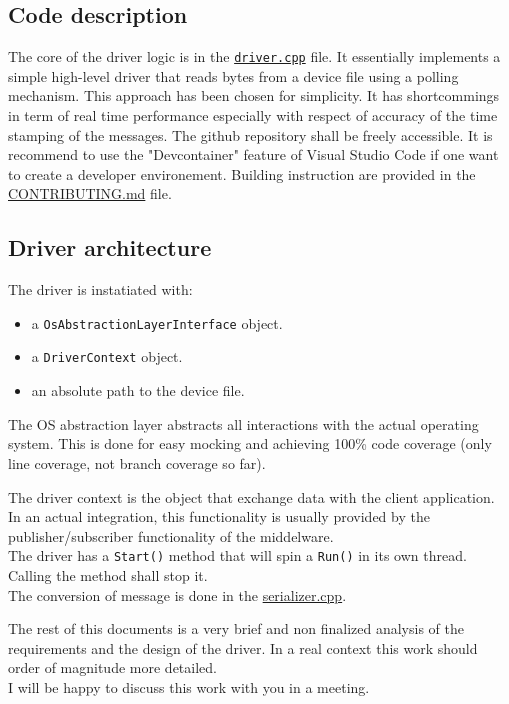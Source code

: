 \subsection{Code description}
The core of the driver logic is in the \href{https://github.com/renn0xtek9/assignment/blob/master/flight_software/libs/embedded_software/uart_imu_driver/src/driver.cpp}{\texttt{driver.cpp}} file.
It essentially implements a simple high-level driver that reads bytes from a device file using a polling mechanism.
This approach has been chosen for simplicity.
It has shortcommings in term of real time performance especially with respect of accuracy of the time stamping of the messages.
The github repository shall be freely accessible. It is recommend to use the "Devcontainer" feature of Visual Studio Code if one want to create a developer environement.
Building instruction are provided in the \href{https://github.com/renn0xtek9/assignment/blob/master/CONTRIBUTING.md}{CONTRIBUTING.md} file.

\subsection{Driver architecture}
The driver is instatiated with:
\begin{itemize}
    \item a \texttt{OsAbstractionLayerInterface} object.
    \item a \texttt{DriverContext} object.
    \item an absolute path to the device file.
\end{itemize}

The OS abstraction layer abstracts all interactions with the actual operating system.
This is done for easy mocking and achieving 100\% code coverage (only line coverage, not branch coverage so far).

The driver context is the object that exchange data with the client application.
In an actual integration, this functionality is usually provided by the publisher/subscriber functionality of the middelware.\\
The driver has a \texttt{Start()} method that will spin a \texttt{Run()} in its own thread.
Calling the  method shall stop it.\\
The conversion of message is done in the \href{https://github.com/renn0xtek9/assignment/blob/master/flight_software/libs/embedded_software/serializer/src/serializer.cpp}{serializer.cpp}.

The rest of this documents is a very brief and non finalized analysis of the requirements and the design of the driver.
In a real context this work should order of magnitude more detailed.\\
I will be happy to discuss this work with you in a meeting.
